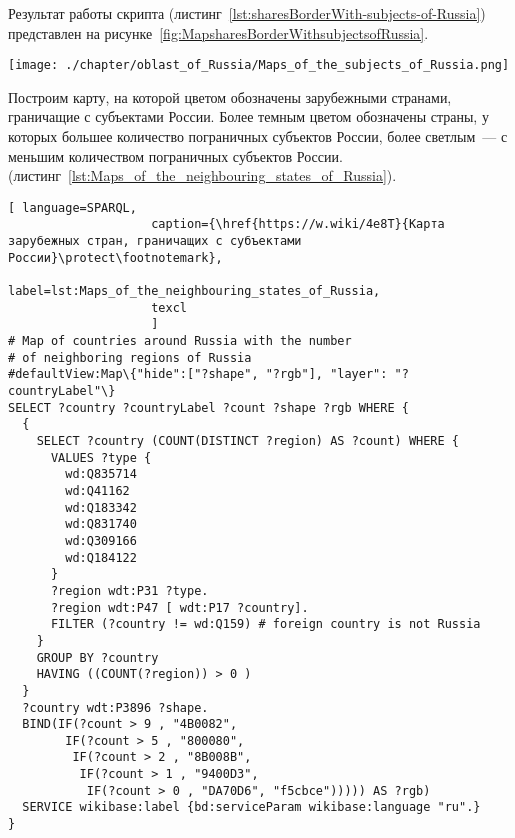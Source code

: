 Результат работы скрипта (листинг~\protect\ref{lst:sharesBorderWith-subjects-of-Russia}) представлен на рисунке~\ref{fig:MapsharesBorderWithsubjectsofRussia}.

\begin{fullwidth}
\begin{figure*}[h]
	\texttt{[image: ./chapter/oblast\_of\_Russia/Maps\_of\_the\_subjects\_of\_Russia.png]}
	\caption[Карта субъектов России, граничащих с зарубежными странами, 2021.]{Карта субъектов России, граничащих с зарубежными странами, 2021. Карта построена на основе данных, полученных с помощью запроса~\protect\ref{lst:sharesBorderWith-subjects-of-Russia}.}%
      \label{fig:MapsharesBorderWithsubjectsofRussia}%
\end{figure*} 
\end{fullwidth}

\newpage
Построим карту, на которой цветом обозначены зарубежными странами, граничащие с субъектами России. Более темным цветом обозначены страны, у которых большее количество пограничных субъектов России, более светлым~--- с меньшим количеством пограничных субъектов России. (листинг~\protect\ref{lst:Maps_of_the_neighbouring_states_of_Russia}).

\lstset{numbers=left, firstnumber=1, frame=single}
\begin{lstlisting}[ language=SPARQL, 
                    caption={\href{https://w.wiki/4e8T}{Карта зарубежных стран, граничащих с субъектами России}\protect\footnotemark},
                    label=lst:Maps_of_the_neighbouring_states_of_Russia,
                    texcl 
                    ]
# Map of countries around Russia with the number 
# of neighboring regions of Russia
#defaultView:Map\{"hide":["?shape", "?rgb"], "layer": "?countryLabel"\}
SELECT ?country ?countryLabel ?count ?shape ?rgb WHERE {
  {
    SELECT ?country (COUNT(DISTINCT ?region) AS ?count) WHERE {
      VALUES ?type {
        wd:Q835714
        wd:Q41162
        wd:Q183342
        wd:Q831740
        wd:Q309166
        wd:Q184122
      }
      ?region wdt:P31 ?type.
      ?region wdt:P47 [ wdt:P17 ?country].
      FILTER (?country != wd:Q159) # foreign country is not Russia
    }
    GROUP BY ?country
    HAVING ((COUNT(?region)) > 0 )
  }
  ?country wdt:P3896 ?shape.
  BIND(IF(?count > 9 , "4B0082", 
        IF(?count > 5 , "800080", 
         IF(?count > 2 , "8B008B", 
          IF(?count > 1 , "9400D3", 
           IF(?count > 0 , "DA70D6", "f5cbce"))))) AS ?rgb)
  SERVICE wikibase:label {bd:serviceParam wikibase:language "ru".}
}
\end{lstlisting}%

